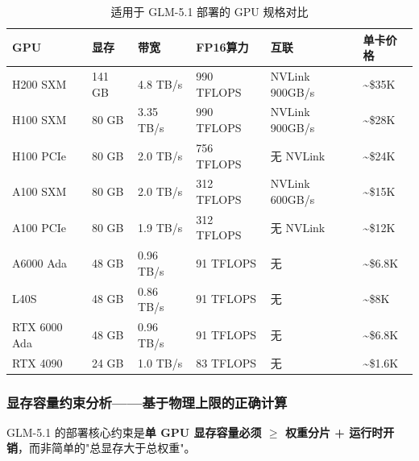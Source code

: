 \documentclass[UTF8,a4paper,10pt,oneside]{ctexart}
\begin{document}
\begin{table}[htbp]
\centering
\caption{适用于 GLM-5.1 部署的 GPU 规格对比}
\begin{tabular}{p{2.2cm}p{1.6cm}p{2cm}p{1.6cm}p{1.8cm}p{1.6cm}}
\hline
\textbf{GPU} & \textbf{显存} & \textbf{带宽} & \textbf{FP16算力} & \textbf{互联} & \textbf{单卡价格} \\
\hline
H200 SXM & 141 GB & 4.8 TB/s & 990 TFLOPS & NVLink 900GB/s & \textasciitilde\$35K \\
H100 SXM & 80 GB & 3.35 TB/s & 990 TFLOPS & NVLink 900GB/s & \textasciitilde\$28K \\
H100 PCIe & 80 GB & 2.0 TB/s & 756 TFLOPS & 无 NVLink & \textasciitilde\$24K \\
A100 SXM & 80 GB & 2.0 TB/s & 312 TFLOPS & NVLink 600GB/s & \textasciitilde\$15K \\
A100 PCIe & 80 GB & 1.9 TB/s & 312 TFLOPS & 无 NVLink & \textasciitilde\$12K \\
A6000 Ada & 48 GB & 0.96 TB/s & 91 TFLOPS & 无 & \textasciitilde\$6.8K \\
L40S & 48 GB & 0.86 TB/s & 91 TFLOPS & 无 & \textasciitilde\$8K \\
RTX 6000 Ada & 48 GB & 0.96 TB/s & 91 TFLOPS & 无 & \textasciitilde\$6.8K \\
RTX 4090 & 24 GB & 1.0 TB/s & 83 TFLOPS & 无 & \textasciitilde\$1.6K \\
\hline
\end{tabular}
\end{table}

\subsubsection{显存容量约束分析——基于物理上限的正确计算}

GLM-5.1 的部署核心约束是\textbf{单 GPU 显存容量必须 $\geq$ 权重分片 + 运行时开销}，而非简单的"总显存大于总权重"。
\end{document}
